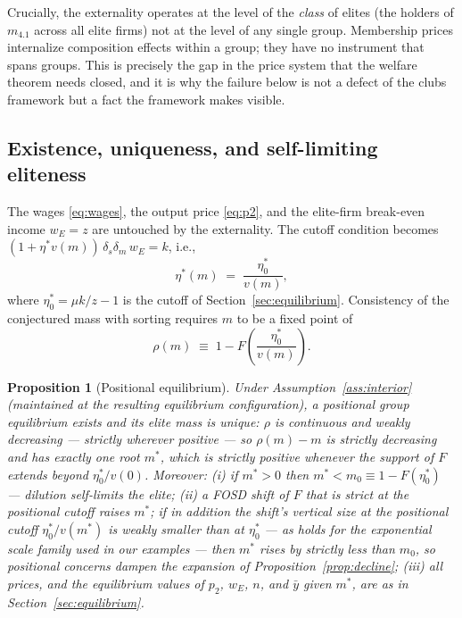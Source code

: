 \documentclass[12pt,letterpaper]{article}
\newtheorem{proposition}{Proposition}
\theoremstyle{definition}
\begin{document}
Crucially, the externality operates at the level of the \emph{class} of elites (the holders of $m_{4.1}$ across all elite firms) not at the level of any single group.
Membership prices internalize composition effects within a group; they have no instrument that spans groups.
This is precisely the gap in the price system that the welfare theorem needs closed, and it is why the failure below is not a defect of the clubs framework but a fact the framework makes visible.

\subsection{Existence, uniqueness, and self-limiting eliteness}

The wages \eqref{eq:wages}, the output price \eqref{eq:p2}, and the elite-firm break-even income $w_E=z$ are untouched by the externality.
The cutoff condition becomes $(1+\eta^\ast v(m))\,\delta_s\delta_m\, w_E = k$, i.e.,
\begin{equation}\label{eq:positional-cutoff}
  \eta^\ast(m) \;=\; \frac{\eta^\ast_0}{v(m)},
\end{equation}
where $\eta^\ast_0 = \mu k/z - 1$ is the cutoff of Section~\ref{sec:equilibrium}.
Consistency of the conjectured mass with sorting requires $m$ to be a fixed point of
\begin{equation}\label{eq:fixedpoint}
  \rho(m) \;\equiv\; 1 - F\!\left(\frac{\eta^\ast_0}{v(m)}\right).
\end{equation}

\begin{proposition}[Positional equilibrium]\label{prop:positional} Under Assumption~\ref{ass:interior} (maintained at the resulting equilibrium configuration), a positional group equilibrium exists and its elite mass is unique: $\rho$ is continuous and weakly decreasing --- strictly wherever positive --- so $\rho(m)-m$ is strictly decreasing and has exactly one root $m^\ast$, which is strictly positive whenever the support of $F$ extends beyond $\eta^\ast_0/v(0)$.
Moreover: (i) if $m^\ast>0$ then $m^\ast < m_0 \equiv 1-F(\eta^\ast_0)$ --- dilution self-limits the elite; (ii) a FOSD shift of $F$ that is strict at the positional cutoff raises $m^\ast$; if in addition the shift's vertical size at the positional cutoff $\eta^\ast_0/v(m^\ast)$ is weakly smaller than at $\eta^\ast_0$ --- as holds for the exponential scale family used in our examples --- then $m^\ast$ rises by strictly less than $m_0$, so positional concerns dampen the expansion of Proposition~\ref{prop:decline}; (iii) all prices, and the equilibrium values of $p_2$, $w_E$, $n$, and $\bar{y}$ given $m^\ast$, are as in Section~\ref{sec:equilibrium}.
\end{proposition}
\end{document}
